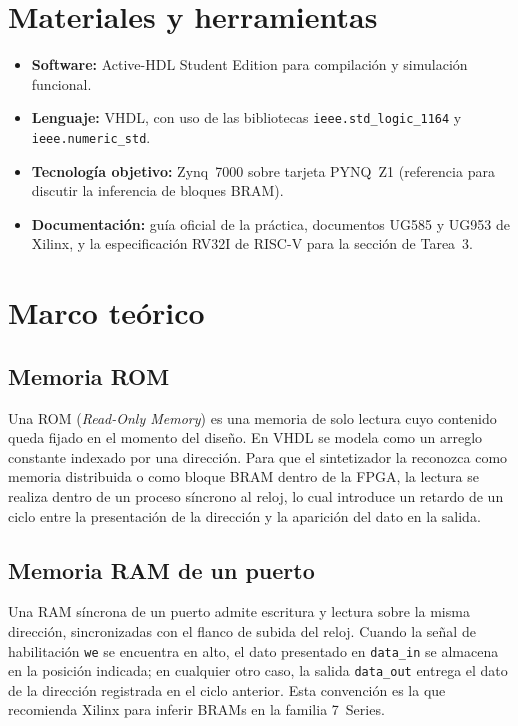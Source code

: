 \documentclass[12pt,letterpaper]{article}
\begin{document}
\section{Materiales y herramientas}
\begin{itemize}
  \item \textbf{Software:} Active-HDL Student Edition para compilación y simulación funcional.
  \item \textbf{Lenguaje:} VHDL, con uso de las bibliotecas \texttt{ieee.std\_logic\_1164} y \texttt{ieee.numeric\_std}.
  \item \textbf{Tecnología objetivo:} Zynq~7000 sobre tarjeta PYNQ~Z1 (referencia para discutir la inferencia de bloques BRAM).
  \item \textbf{Documentación:} guía oficial de la práctica, documentos UG585 y UG953 de Xilinx, y la especificación RV32I de RISC-V para la sección de Tarea~3.
\end{itemize}

\section{Marco teórico}

\subsection{Memoria ROM}
Una ROM (\textit{Read-Only Memory}) es una memoria de solo lectura cuyo contenido queda fijado en el momento del diseño. En VHDL se modela como un arreglo constante indexado por una dirección. Para que el sintetizador la reconozca como memoria distribuida o como bloque BRAM dentro de la FPGA, la lectura se realiza dentro de un proceso síncrono al reloj, lo cual introduce un retardo de un ciclo entre la presentación de la dirección y la aparición del dato en la salida.

\subsection{Memoria RAM de un puerto}
Una RAM síncrona de un puerto admite escritura y lectura sobre la misma dirección, sincronizadas con el flanco de subida del reloj. Cuando la señal de habilitación \texttt{we} se encuentra en alto, el dato presentado en \texttt{data\_in} se almacena en la posición indicada; en cualquier otro caso, la salida \texttt{data\_out} entrega el dato de la dirección registrada en el ciclo anterior. Esta convención es la que recomienda Xilinx para inferir BRAMs en la familia 7~Series.
\end{document}

